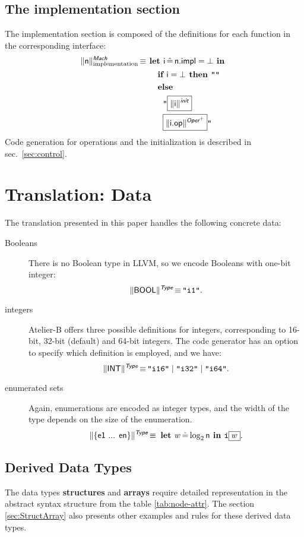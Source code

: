 \documentclass{llncs}
\newcommand{\trad}[2]{\ensuremath{\lVert \textsf{#1} \rVert^{\textit{#2}}}}
\DeclareMathOperator{\isdef}{\equiv}
\newcommand{\llvm}[1]{\texttt{#1}}
\newcommand{\B}[1]{\textsf{#1}}
\newcommand{\ListOf}[1]{$\mbox{#1}^+$}
\newcommand{\IF}[0]{\textbf{ if }}
\newcommand{\ELSE}[0]{\textbf{ else }}
\newcommand{\THEN}[0]{\textbf{ then }}
\newcommand{\LET}[0]{\textbf{ let }}
\DeclareMathOperator{\BE}{\hat{=}}
\newcommand{\IN}[0]{\textbf{ in }}
\newcommand{\PH}[1]{\framebox{$#1$}}
\begin{document}
\subsection{The implementation section}

The implementation section is composed of the definitions for each function
in the corresponding interface:
\begin{align*}
  \trad{\B{n}}{\B{Mach}}_{\text{implementation}} \isdef
  & \LET \B{i} \BE \B{n.impl} = \bot \IN\\
  & \quad \IF \B{i} = \bot \THEN \llvm{""} \\
  & \quad \ELSE \\
  & \quad \quad \llvm{"\PH{\trad{\B{i}}{\B{init}}}} \\
  & \quad \quad \llvm{\PH{\trad{\B{i.op}}{\ListOf{\B{Oper}}}}"}
\end{align*}
Code generation for operations and the initialization is described in
sec.~\ref{sec:control}.

\section{Translation: Data}
\label{sec:data}

The translation presented in this paper handles the following concrete data:
\begin{description}
\item[Booleans] There is no Boolean type in LLVM, so we encode Booleans with
  one-bit integer:
$$\trad{BOOL}{\B{Type}} \isdef \llvm{"i1"}.$$
\item[integers] Atelier-B offers three possible definitions for integers,
  corresponding to 16-bit, 32-bit (default) and 64-bit integers. The code
  generator has an option to specify which definition is employed, and we have:
$$\trad{INT}{\B{Type}} \isdef \llvm{"i16"} \mid \llvm{"i32"} \mid \llvm{"i64"}.$$
\item[enumerated sets] Again, enumerations are encoded as integer types, and the
  width of the type depends on the size of the enumeration.
$$\trad{\{e1 ... en\}}{\B{Type}} \isdef \LET w \BE \log_2 \B{n} \IN \llvm{i\PH{w}}.$$

\end{description}

\subsection{Derived Data Types}

The data types \textbf{structures} and \textbf{arrays} require detailed 
representation in the abstract syntax structure from the table \ref{tab:node-attr}.
The section \ref{sec:StructArray} also presents other examples and rules for these derived data types.
 
\end{document}

